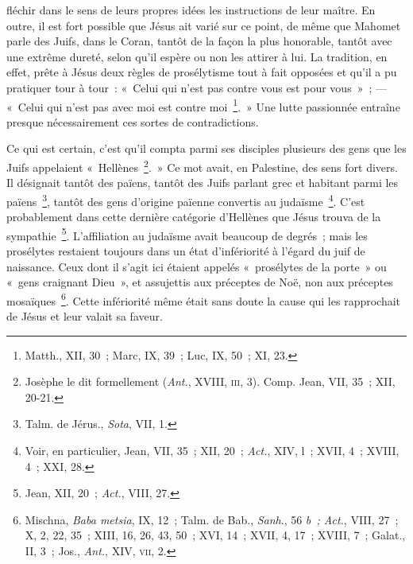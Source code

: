 \documentclass[french,twoside]{book} %
\begin{document}
fléchir dans le sens de leurs propres idées les instructions de leur maître. En outre, il est fort possible que Jésus ait varié sur ce point, de même que Mahomet parle des Juifs, dans le Coran, tantôt de la façon la plus honorable, tantôt avec une extrême dureté, selon qu’il espère ou non les attirer à lui. La tradition, en effet, prête à Jésus deux règles de prosélytisme tout à fait opposées et qu’il a pu pratiquer tour à tour : « Celui qui n’est pas contre vous est pour vous » ; — « Celui qui n’est pas avec moi est contre moi \footnote{Matth., XII, 30 ; Marc, IX, 39 ; Luc, IX, 50 ; XI, 23.}. » Une lutte passionnée entraîne presque nécessairement ces sortes de contradictions.\par
Ce qui est certain, c’est qu’il compta parmi ses disciples plusieurs des gens que les Juifs appelaient « Hellènes \footnote{ Josèphe le dit formellement ({\itshape Ant.}, XVIII, \textsc{iii}, 3). Comp. Jean, VII, 35 ; XII, 20-21.}. » Ce mot avait, en Palestine, des sens fort divers. Il désignait tantôt des païens, tantôt des Juifs parlant grec et habitant parmi les païens \footnote{ Talm. de Jérus., {\itshape Sota}, VII, 1.}, tantôt des gens d’origine païenne convertis au judaïsme \footnote{ Voir, en particulier, Jean, VII, 35 ; XII, 20 ; {\itshape Act.}, XIV, l ; XVII, 4 ; XVIII, 4 ; XXI, 28.}. C’est probablement dans cette dernière catégorie d’Hellènes que Jésus trouva de la sympathie \footnote{ Jean, XII, 20 ; {\itshape Act.}, VIII, 27.}. L’affiliation au judaïsme avait beaucoup de degrés ; mais les prosélytes restaient toujours dans un état d’infériorité à l’égard du juif de naissance. Ceux dont il s’agit ici étaient appelés « prosélytes de la porte » ou « gens craignant Dieu », et assujettis aux préceptes de Noë, non aux préceptes mosaïques \footnote{ Mischna, {\itshape Baba metsia}, IX, 12 ; Talm. de Bab., {\itshape Sanh}., 56 {\itshape b ; Act.}, VIII, 27 ; X, 2, 22, 35 ; XIII, 16, 26, 43, 50 ; XVI, 14 ; XVII, 4, 17 ; XVIII, 7 ; Galat., II, 3 ; Jos., {\itshape Ant.}, XIV, \textsc{vii}, 2.}. Cette infériorité même était sans doute la cause qui les rapprochait de Jésus et leur valait sa faveur.\par
\end{document}
